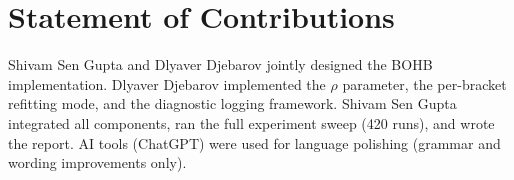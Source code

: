 \documentclass{AIM_report}
\begin{document}
\section*{Statement of Contributions}

Shivam Sen Gupta and Dlyaver Djebarov jointly designed the BOHB
implementation.
Dlyaver Djebarov implemented the $\rho$ parameter, the per-bracket
refitting mode, and the diagnostic logging framework.
Shivam Sen Gupta integrated all components, ran the full experiment
sweep (420 runs), and wrote the report.
AI tools (ChatGPT) were used for language polishing (grammar and
wording improvements only).




\newpage
\pagestyle{empty}

\end{document}
